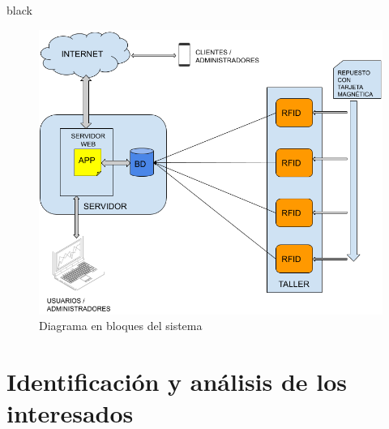 \documentclass[11pt]{charter}
\begin{document}
\begin{consigna}{black}
\begin{figure}[htpb]
\centering 
\includegraphics[width=.9\textwidth]{./Figuras/diagBloques.png}
\caption{Diagrama en bloques del sistema}
\label{fig:diagBloques}
\end{figure}

\vspace{25px}

\end{consigna}


\section{Identificación y análisis de los interesados}
\label{sec:interesados}
\end{document}
